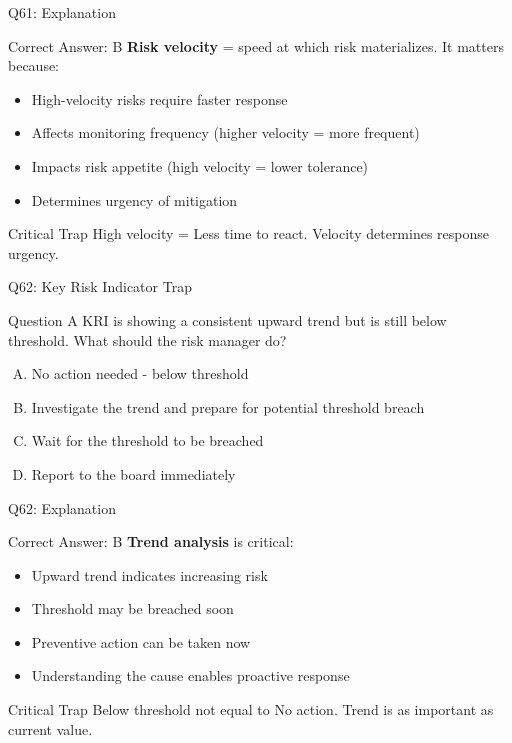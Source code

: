 \documentclass{beamer}
\begin{document}
	\begin{frame}{Q61: Explanation}
		\begin{block}{Correct Answer: B}
			\textbf{Risk velocity} = speed at which risk materializes. It matters because:
			\begin{itemize}
				\item High-velocity risks require faster response
				\item Affects monitoring frequency (higher velocity = more frequent)
				\item Impacts risk appetite (high velocity = lower tolerance)
				\item Determines urgency of mitigation
			\end{itemize}
		\end{block}
		\begin{alertblock}{Critical Trap}
			High velocity = Less time to react.
			Velocity determines response urgency.
		\end{alertblock}
	\end{frame}
	
	\begin{frame}{Q62: Key Risk Indicator Trap}
		\begin{block}{Question}
			A KRI is showing a consistent upward trend but is still below threshold. What should the risk manager do?
		\end{block}
		\begin{enumerate}[(A)]
			\item No action needed - below threshold
			\item Investigate the trend and prepare for potential threshold breach
			\item Wait for the threshold to be breached
			\item Report to the board immediately
		\end{enumerate}
	\end{frame}
	
	\begin{frame}{Q62: Explanation}
		\begin{block}{Correct Answer: B}
			\textbf{Trend analysis} is critical:
			\begin{itemize}
				\item Upward trend indicates increasing risk
				\item Threshold may be breached soon
				\item Preventive action can be taken now
				\item Understanding the cause enables proactive response
			\end{itemize}
		\end{block}
		\begin{alertblock}{Critical Trap}
			Below threshold not equal to No action.
			Trend is as important as current value.
		\end{alertblock}
	\end{frame}
	
\end{document}
